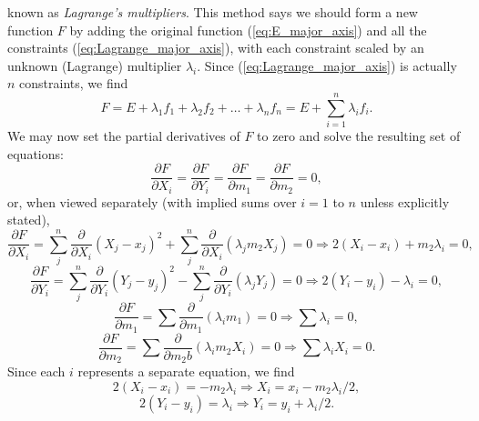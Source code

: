 known as \emph{Lagrange's multipliers}.  This method says we should form a new function $F$ by adding the 
original function (\ref{eq:E_major_axis}) and all the constraints (\ref{eq:Lagrange_major_axis}), with each constraint scaled by an unknown 
(Lagrange) multiplier $\lambda _i$.  Since (\ref{eq:Lagrange_major_axis}) is actually $n$ constraints, we find
\begin{equation}
F = E + \lambda_1 f_1 + \lambda_2 f_2 + \ldots + \lambda_n f_n = E + \sum ^n _{i=1} \lambda_i f_i.
\label{eq:MA_partials}
\end{equation}	 
We may now set the partial derivatives of $F$ to zero and solve the resulting set of equations:
\begin{equation}
\frac{\partial F}{\partial X_i} = \frac{\partial F}{\partial Y_i} = \frac{\partial F}{\partial m_1} = \frac{\partial F}{\partial m_2} = 0,
\end{equation}
or, when viewed separately (with implied sums over $i = 1$ to $n$ unless explicitly stated), 
\begin{equation}
\frac{\partial F}{\partial X_i} = \sum_j^n \frac{\partial}{\partial X_i} ( X_j - x_j)^2  + \sum_j^n \frac{\partial}{\partial X_i}
(\lambda_j m_2 X_j) = 0 \Rightarrow 2(X_i - x_i) + m_2 \lambda_i = 0,
\end{equation}
\begin{equation}
\frac{\partial F}{\partial Y_i} = \sum_j^n \frac{\partial}{\partial Y_i} ( Y_j - y_j)^2  - \sum_j^n \frac{\partial}{\partial Y_i}
(\lambda_j Y_j) = 0  \Rightarrow 2(Y_i - y_i) -  \lambda_i = 0,
\end{equation}
\begin{equation}
\frac{\partial F}{\partial m_1} = \sum  \frac{\partial}{\partial m_1} (\lambda_i m_1) = 0  \Rightarrow \sum \lambda_i  = 0,
\label{eq:lambda_major}
\end{equation}
\begin{equation}
\frac{\partial F}{\partial m_2} = \sum \frac{\partial}{\partial m_2b}(\lambda_i m_2 X_i) = 0  \Rightarrow \sum \lambda_i X_i = 0.
\label{eq:lambda_x_major}
\end{equation}
Since each $i$ represents a separate equation, we find
\begin{equation}
2(X_i - x_i) = -m_2 \lambda_i \Rightarrow X_i = x_i - m_2 \lambda_i/2,
\label{eq:Xisolution}
\end{equation}
\begin{equation}
2(Y_i - y_i) = \lambda_i \Rightarrow Y_i = y_i + \lambda_i/2.
\end{equation}	 

